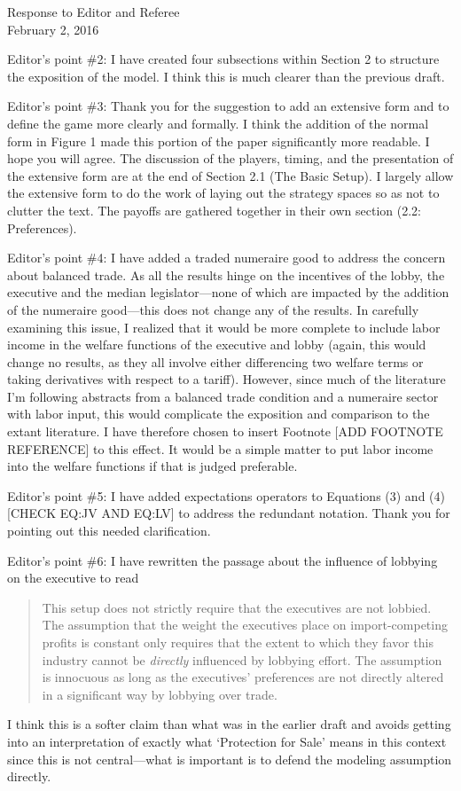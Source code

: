 \documentclass[12pt]{article}
\begin{document}
\begin{center}
\large Response to Editor and Referee \\
\normalsize February 2, 2016
\end{center}

Editor's point $\#$2: I have created four subsections within Section 2 to structure the exposition of the model. I think this is much clearer than the previous draft.

Editor's point $\#$3: Thank you for the suggestion to add an extensive form and to define the game more clearly and formally. I think the addition of the normal form in Figure 1 made this portion of the paper significantly more readable. I hope you will agree. The discussion of the players, timing, and the presentation of the extensive form are at the end of Section 2.1 (The Basic Setup). I largely allow the extensive form to do the work of laying out the strategy spaces so as not to clutter the text. The payoffs are gathered together in their own section (2.2: Preferences).

Editor's point $\#$4: I have added a traded numeraire good to address the concern about balanced trade. As all the results hinge on the incentives of the lobby, the executive and the median legislator---none of which are impacted by the addition of the numeraire good---this does not change any of the results. In carefully examining this issue, I realized that it would be more complete to include labor income in the welfare functions of the executive and lobby (again, this would change no results, as they all involve either differencing two welfare terms or taking derivatives with respect to a tariff). However, since much of the literature I'm following abstracts from a balanced trade condition and a numeraire sector with labor input, this would complicate the exposition and comparison to the extant literature. I have therefore chosen to insert Footnote [{\color{blue}ADD FOOTNOTE REFERENCE}] to this effect. It would be a simple matter to put labor income into the welfare functions if that is judged preferable.

Editor's point $\#$5: I have added expectations operators to Equations (3) and (4) [{\color{blue}CHECK EQ:JV AND EQ:LV}] to address the redundant notation. Thank you for pointing out this needed clarification.

Editor's point $\#$6: I have rewritten the passage about the influence of lobbying on the executive to read
\begin{quote}
  This setup does not strictly require that the executives are not lobbied. The assumption that the weight the executives place on import-competing profits is constant only requires that the extent to which they favor this industry cannot be \textit{directly} influenced by lobbying effort. The assumption is innocuous as long as the executives' preferences are not directly altered in a significant way by lobbying over trade.
\end{quote}
I think this is a softer claim than what was in the earlier draft and avoids getting into an interpretation of exactly what `Protection for Sale' means in this context since this is not central---what is important is to defend the modeling assumption directly.
\end{document}
